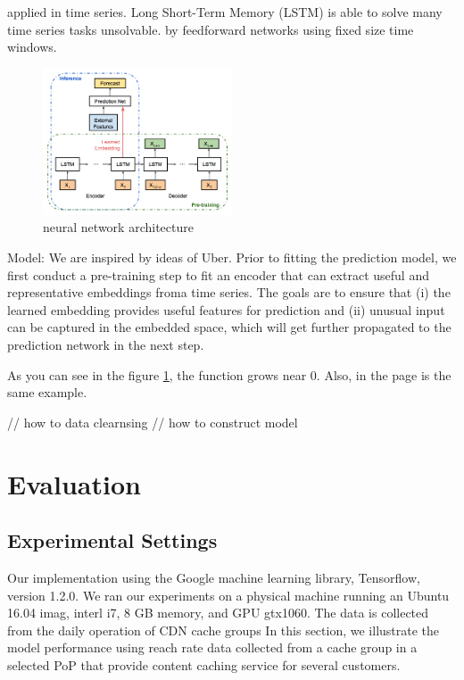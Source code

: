 \documentclass[review]{elsarticle}
\newcommand{\dabiaolv}{reach rate }
\begin{document}
\cite{MalhotraLongSeries} applied in time series. Long Short-Term Memory (LSTM) is able to solve many time series tasks unsolvable. by feedforward networks using fixed size time windows\cite{Gers2001ApplyingApproaches}.

\begin{figure}[h]
    \centering
    \includegraphics[width=0.5\textwidth]{neural_network_architecture.png}
    \caption{neural network architecture}
    \label{fig:neural_network_architecture}
\end{figure}

Model: We are inspired by ideas of Uber. Prior to fitting the prediction model, we first conduct a pre-training step to fit an encoder that can extract useful and representative embeddings froma  time  series.  The  goals  are  to  ensure  that  (i)  the  learned embedding  provides  useful  features  for  prediction  and  (ii) unusual input can be captured in the embedded space, which will get further propagated to the prediction network in the next step.

As you can see in the figure \ref{fig:neural_network_architecture}, the  function grows near 0. Also, in the page \pageref{fig:neural_network_architecture} 
is the same example.


// how to data clearnsing
// how to construct model

\section{Evaluation}
\subsection{Experimental Settings}
Our implementation using the Google machine learning library, Tensorflow, version 1.2.0. We ran our experiments on a physical machine running an Ubuntu 16.04 imag, interl i7, 8 GB memory, and GPU gtx1060.
The data is collected from the daily operation of CDN cache groups
In this section, we illustrate the model performance using \dabiaolv data collected from a cache group in a selected PoP that provide content caching service for several customers. 
\end{document}
